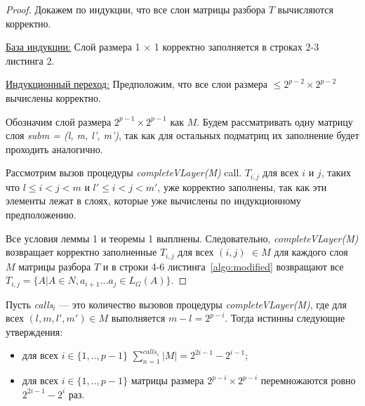 \documentclass[14pt]{matmex-diploma-custom}
\begin{document}
\begin{proof}

Докажем по индукции, что все слои матрицы разбора $T$ вычисляются корректно.

\underline{База индукции:} Слой размера 1 × 1 корректно заполняется в строках 2-3 листинга 2.

\underline{Индукционный переход:} Предположим, что все слои размера $\le 2^{p - 2} \times 2^{p - 2}$ вычислены корректно.

Обозначим слой размера $2^{p - 1} \times 2^{p - 1}$ как $M$. Будем рассматривать одну матрицу слоя \textit{subm = (l, m, l', m')}, так как для остальных подматриц их заполнение будет проходить аналогично.

Рассмотрим вызов процедуры \textit{completeVLayer(M)} call. 
$T_{i,j}$ для всех $i$ и $j$, таких что $l \leq i < j < m$ и $l' \leq i < j < m'$, уже корректно заполнены, так как эти элементы лежат в слоях, которые уже вычислены по индукционному предположению.

Все условия леммы 1 и теоремы 1 выплнены. Следовательно, \textit{completeVLayer(M)} возвращает корректно заполненные $T_{i, j}$ для всех $(i, j)$ $\in M$ для каждого слоя $M$ матрицы разбора $T$ и в строки 4-6 листинга~\ref{algo:modified} возвращают все $T_{i, j} =  \{ A | A \in N, a_{i + 1} \dots a_{j} \in L_{G}(A)\}$.

\end{proof}

\begin{lemma}
Пусть \textit{calls$_{i}$} --- это количество вызовов процедуры \textit{completeVLayer(M)}, где для всех $(l, m, l', m') \in M$ выполняется $m - l = 2^{p - i}$. Тогда истинны следующие утверждения:
\begin{itemize}
 \item для всех $i \in \{ 1, .., p - 1\}$  $\sum_{n=1}^{calls_i}{|M|} = 2^{2i - 1} - 2^{i - 1}$;
 \item для всех $ i \in \{ 1, .., p - 1\}$ матрицы размера $2^{p - i} \times 2^{p - i}$ перемножаются ровно $2^{2i - 1} - 2^{i}$ раз.
\end{itemize}
\end{lemma}
\end{document}
